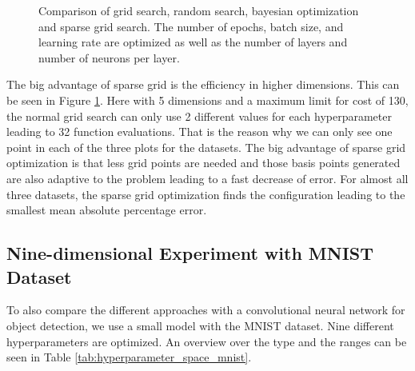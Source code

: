 \begin{figure}[htbp!]
	\caption{  Comparison of grid search, random search, bayesian optimization and sparse grid search. The number of epochs, batch size, and learning rate are optimized as well as the number of layers and number of neurons per layer. }	
	\label{fig:result_second_comparison_dim5}
\end{figure}


The big advantage of sparse grid is the efficiency in higher dimensions. This can be seen in Figure \ref{fig:result_second_comparison_dim5}. Here with 5 dimensions and a maximum limit for cost of 130, the normal grid search can only use 2 different values for each hyperparameter leading to 32 function evaluations. That is the reason why we can only see one point in each of the three plots for the datasets. The big advantage of sparse grid optimization is that less grid points are needed and those basis points generated are also adaptive to the problem leading to a fast decrease of error. For almost all three datasets, the sparse grid optimization finds the configuration leading to the smallest mean absolute percentage error. 


\subsection{Nine-dimensional Experiment with MNIST Dataset}

To also compare the different approaches with a convolutional neural network for object detection, we use a small model with the MNIST dataset. Nine different hyperparameters are optimized. An overview over the type and the ranges can be seen in Table \ref{tab:hyperparameter_space_mnist}.

